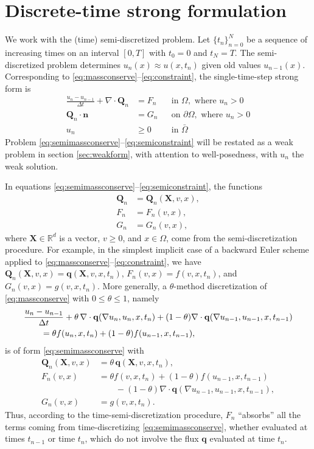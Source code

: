 \documentclass[final,leqno,onefignum,onetabnum]{siamltex1213bueler}
\newcommand\bn{\mathbf{n}}
\newcommand\bq{\mathbf{q}}
\newcommand\bQ{\mathbf{Q}}
\newcommand\bX{\mathbf{X}}
\newcommand{\Div}{\nabla\cdot}
\renewcommand{\grad}{\nabla}
\newcommand\RR{\mathbb{R}}
\begin{document}
\section{Discrete-time strong formulation}  \label{sec:discreteform}

We work with the (time) semi-discretized problem.  Let $\{t_n\}_{n=0}^N$ be a sequence of increasing times on an interval $[0,T]$ with $t_0=0$ and $t_N=T$.  The semi-discretized problem determines $u_n(x) \approx u(x,t_n)$ given old values $u_{n-1}(x)$.  Corresponding to \eqref{eq:massconserve}--\eqref{eq:constraint}, the single-time-step strong form is
\begin{align}
\frac{u_n - u_{n-1}}{\Delta t} + \Div \bQ_n &= F_n &&\text{in } \Omega, \text{ where } u_n > 0 \label{eq:semimassconserve} \\
\bQ_n \cdot \bn &= G_n &&\text{on } \partial\Omega, \text{ where } u_n > 0 \label{eq:semifixedneumann} \\
u_n &\ge 0 &&\text{in } \bar\Omega \label{eq:semiconstraint}
\end{align}
Problem \eqref{eq:semimassconserve}--\eqref{eq:semiconstraint} will be restated as a weak problem in section \ref{sec:weakform}, with attention to well-posedness, with $u_n$ the weak solution.

In equations \eqref{eq:semimassconserve}--\eqref{eq:semiconstraint}, the functions
\begin{align}
 \bQ_n &= \bQ_n(\bX,v,x), \label{eq:Qnfunctionalform} \\
 F_n &= F_n(v,x), \label{eq:Fnfunctionalform} \\
 G_n &= G_n(v,x), \label{eq:Gnfunctionalform}
\end{align}
where $\bX\in\RR^d$ is a vector, $v\ge 0$, and $x\in \Omega$, come from the semi-discretization procedure.  For example, in the simplest implicit case of a backward Euler scheme applied to \eqref{eq:massconserve}--\eqref{eq:constraint}, we have $\bQ_n(\bX,v,x) = \bq(\bX,v,x,t_n)$, $F_n(v,x) = f(v,x,t_n)$, and $G_n(v,x) = g(v,x,t_n)$.  More generally, a $\theta$-method discretization of \eqref{eq:massconserve} with $0\le \theta \le 1$, namely
\begin{align}
  &\frac{u_n - u_{n-1}}{\Delta t} + \theta\, \Div \bq(\grad u_n,u_n,x,t_n) + (1-\theta) \Div \bq(\grad u_{n-1},u_{n-1},x,t_{n-1}) \label{eq:thetamethod} \\
  &\qquad =  \theta f(u_n,x,t_n) + (1-\theta) f(u_{n-1},x,t_{n-1}), \notag
\end{align}
is of form \eqref{eq:semimassconserve} with
\begin{align*}
\bQ_n(\bX,v,x) &= \theta\, \bq(\bX,v,x,t_n), \\
F_n(v,x)       &= \theta f(v,x,t_n) + (1-\theta) f(u_{n-1},x,t_{n-1}) \\
               &\qquad - (1-\theta) \Div \bq(\grad u_{n-1},u_{n-1},x,t_{n-1}), \\
G_n(v,x)       &= g(v,x,t_n).
\end{align*}
Thus, according to the time-semi-discretization procedure, $F_n$ ``absorbs'' all the terms coming from time-discretizing \eqref{eq:semimassconserve}, whether evaluated at times $t_{n-1}$ or time $t_n$, which do not involve the flux $\bq$ evaluated at time $t_n$.
\end{document}

